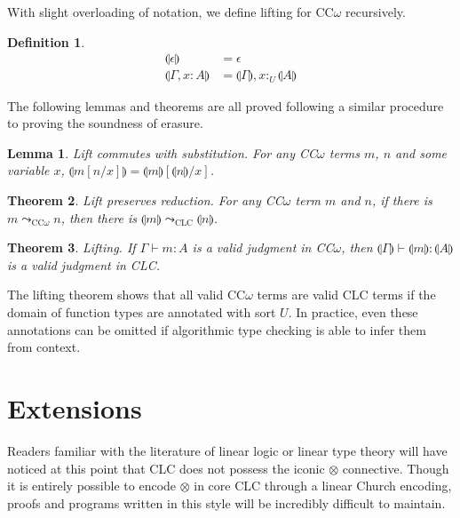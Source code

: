 \documentclass[sigplan,screen]{acmart}
\newtheorem{theorem}{Theorem}[section]
\newtheorem{lemma}[theorem]{Lemma}
\theoremstyle{definition}
\newtheorem{definition}{Definition}[section]
\newcommand{\utype}{:_{\scriptscriptstyle U}}
\newcommand{\step}{\leadsto}
\newcommand{\lift}[1]{\llparenthesis #1 \rrparenthesis}
\begin{document}
  With slight overloading of notation, we define lifting for CC$\omega$ recursively.
  \begin{definition}
    \begin{align*}
      \lift{\epsilon} &= \epsilon \\
      \lift{\Gamma, x : A} &= \lift{\Gamma}, x \utype \lift{A}
    \end{align*}
  \end{definition}

  The following lemmas and theorems are all proved following a similar procedure to proving the soundness of erasure.
  \begin{lemma}
    Lift commutes with substitution. For any CC$\omega$ terms $m$, $n$ and some variable $x$, $\lift{m[n/x]} = \lift{m}[\lift{n}/x]$.
  \end{lemma}

  \begin{theorem}
    Lift preserves reduction. For any CC$\omega$ term $m$ and $n$, if there is $m \step_{\scriptscriptstyle \text{CC}\omega} n$, then there is $\lift{m} \step_{\scriptscriptstyle \text{CLC}} \lift{n}$.
  \end{theorem}

  \begin{theorem}
    Lifting. If $\Gamma \vdash m : A$ is a valid judgment in CC$\omega$, then $\lift{\Gamma} \vdash \lift{m} : \lift{A}$ is a valid judgment in CLC.
  \end{theorem}

  The lifting theorem shows that all valid CC$\omega$ terms are valid CLC terms if the domain of function types are annotated with sort $U$. In practice, even these annotations can be omitted if algorithmic type checking is able to infer them from context.

  \section{Extensions}
  Readers familiar with the literature of linear logic or linear type theory will have noticed at this point that CLC does not possess the iconic $\otimes$ connective. Though it is entirely possible to encode $\otimes$ in core CLC through a linear Church encoding, proofs and programs written in this style will be incredibly difficult to maintain.
\end{document}
